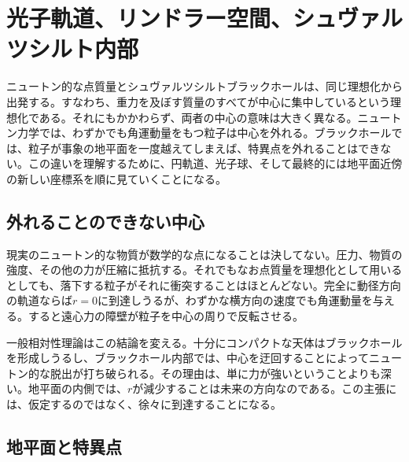 \chapter{光子軌道、リンドラー空間、シュヴァルツシルト内部}

ニュートン的な点質量とシュヴァルツシルトブラックホールは、同じ理想化から出発する。すなわち、重力を及ぼす質量のすべてが中心に集中しているという理想化である。それにもかかわらず、両者の中心の意味は大きく異なる。ニュートン力学では、わずかでも角運動量をもつ粒子は中心を外れる。ブラックホールでは、粒子が事象の地平面を一度越えてしまえば、特異点を外れることはできない。この違いを理解するために、円軌道、光子球、そして最終的には地平面近傍の新しい座標系を順に見ていくことになる。

\section{外れることのできない中心}

現実のニュートン的な物質が数学的な点になることは決してない。圧力、物質の強度、その他の力が圧縮に抵抗する。それでもなお点質量を理想化として用いるとしても、落下する粒子がそれに衝突することはほとんどない。完全に動径方向の軌道ならば\(r=0\)に到達しうるが、わずかな横方向の速度でも角運動量を与える。すると遠心力の障壁が粒子を中心の周りで反転させる。

一般相対性理論はこの結論を変える。十分にコンパクトな天体はブラックホールを形成しうるし、ブラックホール内部では、中心を迂回することによってニュートン的な脱出が打ち破られる。その理由は、単に力が強いということよりも深い。地平面の内側では、\(r\)が減少することは未来の方向なのである。この主張には、仮定するのではなく、徐々に到達することになる。

\begin{classroomqa}
\end{classroomqa}

\section{地平面と特異点}

